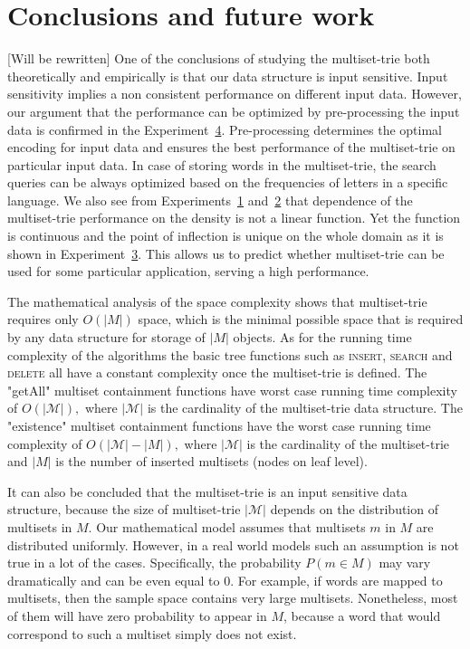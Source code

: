 \section{Conclusions and future work} \label{c:conclusions}
[Will be rewritten]
%
%
One of the conclusions of studying the multiset-trie both theoretically and 
empirically is that our data structure is input sensitive. Input sensitivity implies 
a non consistent performance on different input data. However, our argument 
that the performance can be optimized by pre-processing the input data 
is confirmed in the Experiment~\hyperref[ss:exp3]{4}. 
Pre-processing determines the optimal encoding for input data and ensures the 
best performance of the multiset-trie on particular input data. In case of storing 
words in the multiset-trie, the search queries can be always optimized based on 
the frequencies of letters in a specific language. We also see from 
Experiments~\hyperref[s:exp1]{1} and~\hyperref[s:exp2]{2} that dependence of 
the multiset-trie performance on the density is not a linear function. Yet the function 
is continuous and the point of inflection is unique on the whole domain as it is shown 
in Experiment~\hyperref[s:exp3]{3}. This allows us to predict whether multiset-trie 
can be used for some particular application, serving a high performance. 
%

%
The mathematical analysis of the space complexity shows that multiset-trie requires 
only $O(|M|)$ space, which is the minimal possible space that is required by any 
data structure for storage of $|M|$ objects. As for the running time complexity of the 
algorithms the basic tree functions such as \textsc{insert}, \textsc{search} and 
\textsc{delete} all have a constant complexity once the multiset-trie is defined. 
The "getAll" multiset containment functions have worst case running time complexity of 
$O(|\mathcal{M}|),$ where $|\mathcal{M}|$ is the cardinality of the multiset-trie data structure. 
The "existence" multiset containment functions have the worst case running time 
complexity of $O(|\mathcal{M}| - |M|),$ where $|\mathcal{M}|$ is the cardinality of 
the multiset-trie and $|M|$ is the number of inserted multisets (nodes on leaf level). 

It can also be concluded that the multiset-trie is an input sensitive data structure, 
because the size of multiset-trie $|\mathcal{M}|$ depends on the distribution of 
multisets in $M.$ Our mathematical model assumes that multisets $m$ in $M$ 
are distributed uniformly. However, in a real world models such an assumption 
is not true in a lot of the cases. Specifically, the probability $P(m\in M)$ may vary 
dramatically and can be even equal to $0.$ For example, if words are mapped to 
multisets, then the sample space contains very large multisets. Nonetheless, most of 
them will have zero probability to appear in $M$, because a word that would 
correspond to such a multiset simply does not exist.
%

